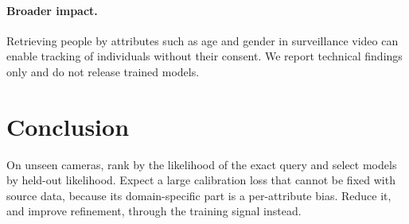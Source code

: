 \documentclass[10pt,twocolumn,letterpaper]{article}
\begin{document}
\paragraph{Broader impact.} Retrieving people by attributes such as age and gender in surveillance video can enable tracking of individuals without their consent. We report technical findings only and do not release trained models.

\section{Conclusion}

On unseen cameras, rank by the likelihood of the exact query and select models by held-out likelihood. Expect a large calibration loss that cannot be fixed with source data, because its domain-specific part is a per-attribute bias. Reduce it, and improve refinement, through the training signal instead.
\end{document}
